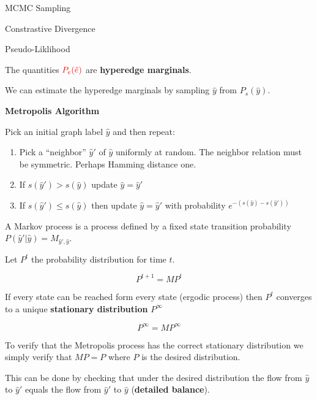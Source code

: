 {

MCMC Sampling

\vfill
Constrastive Divergence

\vfill
Pseudo-Liklihood


The quantities ${\color{red} P_e(\tilde{e})}$ are {\bf hyperedge marginals}.

\vfill
We can estimate the hyperedge marginals by sampling $\hat{y}$ from $P_s(\hat{y})$.


\centerline{\bf Metropolis Algorithm}

\vfill
Pick an initial graph label $\hat{y}$ and then repeat:

\begin{enumerate}
\item Pick a ``neighbor'' $\hat{y}'$ of $\hat{y}$ uniformly at random.  The neighbor relation must be symmetric.  Perhaps Hamming distance one.

  \vfill
\item If $s(\hat{y}') > s(\hat{y})$ update $\hat{y} = \hat{y}'$

  \vfill
\item If $s(\hat{y}') \leq s(\hat{y})$ then update $\hat{y} = \hat{y}'$ with probability $e^{-(s(\hat{y}) - s(\hat{y}'))}$
  \end{enumerate}  


A Markov process is a process defined by a fixed state transition probability $P(\hat{y}'|\hat{y}) = M_{\hat{y}',\hat{y}}$.

\vfill
Let $P^t$ the probability distribution for time $t$.

\vfill
$$P^{t+1} = MP^t$$

\vfill
If every state can be reached form every state (ergodic process) then $P^t$ converges to a unique {\bf stationary distribution} $P^\infty$

\vfill
$$P^\infty = MP^\infty$$


To verify that the Metropolis process has the correct stationary distribution we simply verify that $MP = P$ where $P$
is the desired distribution.

\vfill
This can be done by checking that under the desired distribution the flow from $\hat{y}$ to $\hat{y}'$
equals the flow from $\hat{y}'$ to $\hat{y}$ ({\bf detailed balance}).

}
